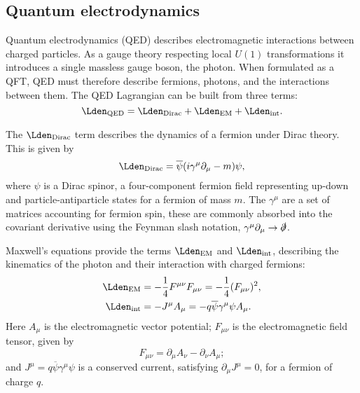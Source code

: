 \subsection{Quantum electrodynamics}

Quantum electrodynamics (QED) describes electromagnetic interactions
between charged particles.  As a gauge theory respecting local $U(1)$
transformations it introduces a single massless gauge boson, the photon. When
formulated as a \ac{QFT}, \ac{QED} must therefore describe fermions, photons,
and the interactions between them.  The \ac{QED} Lagrangian can be built from
three terms:
\newcommand\LQED{\ensuremath{\Lden_\text{QED}}\xspace}
\newcommand\LDirac{\ensuremath{\Lden_\text{Dirac}}\xspace}
\newcommand\LEM{\ensuremath{\Lden_\text{EM}}\xspace}
\newcommand\Lint{\ensuremath{\Lden_\text{int}}\xspace}
%
\begin{equation*}
  \LQED = \LDirac + \LEM + \Lint.
\end{equation*}
%

The \LDirac term describes the dynamics of a fermion under Dirac theory. This is
given by
%
\begin{equation*}
  \LDirac = \overline{\psi}(i\gamma^\mu\partial_\mu - m)\psi,
\end{equation*}
where $\psi$ is a Dirac spinor, a four-component fermion field representing
up-down and particle-antiparticle states for a fermion of mass $m$. The
$\gamma^\mu$ are a set of matrices accounting for fermion spin, these are
commonly absorbed into the covariant derivative using the Feynman slash
notation, $\gamma^\mu\partial_\mu \to \slashed{\partial}$.

Maxwell's equations provide the terms \LEM and \Lint, describing the kinematics
of the photon and their interaction with charged fermions:
%
\begin{align*}
  \LEM  &= -\frac14 F^{\mu\nu}F_{\mu\nu} = -\frac14 (F_{\mu\nu})^2, \\
  \Lint &= -J^\mu A_\mu = -q\overline{\psi}\gamma^\mu\psi A_\mu.
\end{align*}
%
Here $A_\mu$ is the electromagnetic vector potential; $F_{\mu\nu}$ is the
electromagnetic field tensor, given by
\begin{equation}
  F_{\mu\nu} = \partial_\mu A_\nu - \partial_\nu A_\mu;
  \label{eqn:theory-theories-qed-fieldstrength}
\end{equation}
and $J^\mu = q\overline{\psi}\gamma^\mu\psi$ is a conserved current, satisfying
$\partial_\mu J^\mu = 0$, for a fermion of charge $q$.

